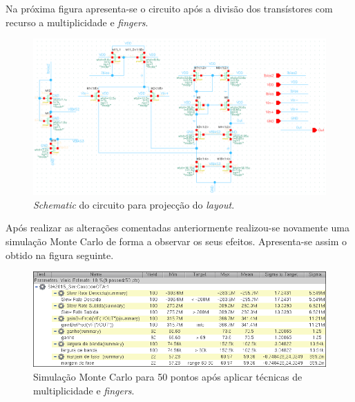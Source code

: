 \documentclass[11pt]{article}
\numberwithin{equation}{section}
\begin{document}
Na próxima figura apresenta-se o circuito após a divisão dos transístores com recurso a multiplicidade e \textit{fingers}.

\begin{figure}[H]
	\centering
	\includegraphics[keepaspectratio=true, scale=0.55]{exps/schematicdiv}
	\vspace{-0.5em}
	\caption{\textit{Schematic} do circuito para projecção do \textit{layout}.}
	\vspace{-0.8em}
\end{figure} 

Após realizar as alterações comentadas anteriormente realizou-se novamente uma simulação Monte Carlo de forma a observar os seus efeitos. Apresenta-se assim o obtido na figura seguinte.

\begin{figure}[H]
	\centering
	\includegraphics[keepaspectratio=true, scale=0.65]{exps/MonteCarlo_50pt_Novo_Sin}
	\vspace{-0.5em}
	\caption{Simulação Monte Carlo para 50 pontos após aplicar técnicas de multiplicidade e \textit{fingers}.}
	\vspace{-0.8em}
\end{figure} 
\end{document}
